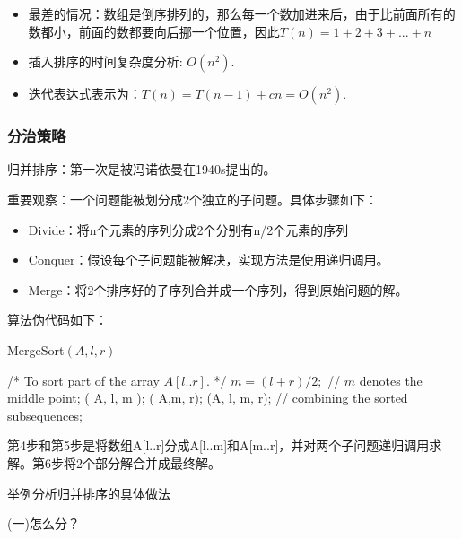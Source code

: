 \begin{itemize}

\item 最差的情况：数组是倒序排列的，那么每一个数加进来后，由于比前面所有的数都小，前面的数都要向后挪一个位置，因此$T(n)= 1+2+3+...+n$

\item 
插入排序的时间复杂度分析: $O(n^2)$. 

\item 迭代表达式表示为：$T(n) = T(n-1) + cn =
O(n^2)$.
\end{itemize}

\subsubsection{分治策略}

归并排序：第一次是被冯诺依曼在1940s提出的。

重要观察：一个问题能被划分成2个独立的子问题。具体步骤如下：

\begin{itemize}
\item Divide：将n个元素的序列分成2个分别有n/2个元素的序列

\item Conquer：假设每个子问题能被解决，实现方法是使用递归调用。

\item Merge：将2个排序好的子序列合并成一个序列，得到原始问题的解。
\end{itemize}

算法伪代码如下：

\noindent
\begin{small}

{\sc MergeSort}$( A, l, r )$
\begin{algorithmic}[1] 
\STATE/* To sort part of the array $A[l..r]$. */
	\STATE $m = ( l + r )/ 2; $ // $m$ denotes the middle point; 
	( A, l, m ); 
	( A,m, r); 
	(A, l, m, r); // combining the sorted subsequences; 
\ENDIF
\end{algorithmic}
\end{small}

	第4步和第5步是将数组A[l..r]分成A[l..m]和A[m..r]，并对两个子问题递归调用求解。第6步将2个部分解合并成最终解。
	
	举例分析归并排序的具体做法
	
	(一)怎么分？

